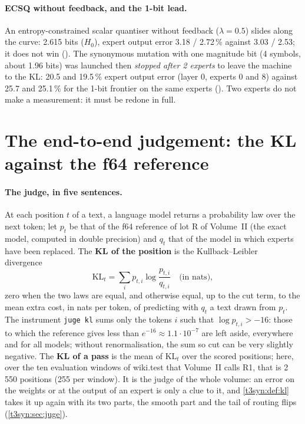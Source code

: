 \paragraph{ECSQ without feedback, and the 1-bit lead.} An entropy-constrained scalar quantiser without feedback ($\lambda = 0.5$) slides along the curve: 2.615 bits ($H_0$), expert output error 3.18 / 2.72\,\% against 3.03 / 2.53; it does not win (). The synonymous mutation with one magnitude bit (4 symbols, about 1.96 bits) was launched then \emph{stopped after 2 experts} to leave the machine to the KL: 20.5 and 19.5\,\% expert output error (layer 0, experts 0 and 8) against 25.7 and 25.1\,\% for the 1-bit frontier on the same experts (). Two experts do not make a measurement: it must be redone in full.

\section{The end-to-end judgement: the KL against the f64 reference}\label{t3ecl:sec:kl}

\paragraph{The judge, in five sentences.} At each position $t$ of a text, a language model returns a probability law over the next token; let $p_t$ be that of the f64 reference of lot R of Volume~II (the exact model, computed in double precision) and $q_t$ that of the model in which experts have been replaced. The \textbf{KL of the position} is the Kullback--Leibler divergence~\cite{kullback1951}
\begin{equation}\label{t3ecl:eq:kl}
\mathrm{KL}_t = \sum_i p_{t,i} \log \frac{p_{t,i}}{q_{t,i}} \quad \text{(in nats)},
\end{equation}
zero when the two laws are equal, and otherwise equal, up to the cut term, to the mean extra cost, in nats per token, of predicting with $q_t$ a text drawn from $p_t$. The instrument \texttt{juge kl} sums only the tokens $i$ such that $\log p_{t,i} > -16$: those to which the reference gives less than $e^{-16} \approx 1.1\cdot10^{-7}$ \calc{} are left aside, everywhere and for all models; without renormalisation, the sum so cut can be very slightly negative. The \textbf{KL of a pass} is the mean of $\mathrm{KL}_t$ over the scored positions; here, over the ten evaluation windows of wiki.test that Volume~II calls R1, that is 2\,550 positions (255 per window). It is the judge of the whole volume: an error on the weights or at the output of an expert is only a clue to it, and \cref{t3syn:def:kl} takes it up again with its two parts, the smooth part and the tail of routing flips (\cref{t3syn:sec:juge}).

